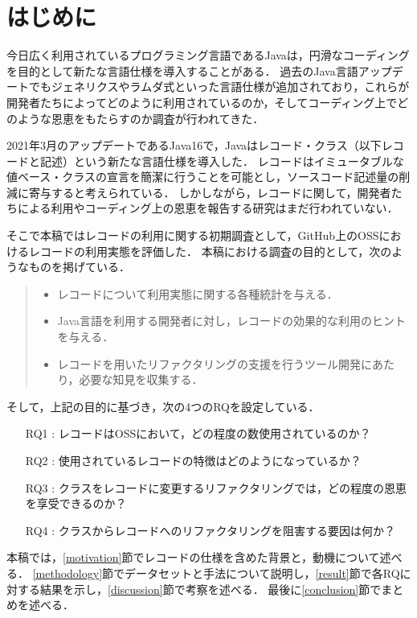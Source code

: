 \section{はじめに\label{intro}}

今日広く利用されているプログラミング言語であるJavaは，円滑なコーディングを目的として新たな言語仕様を導入することがある\cite{Usage_Of_Java_Language_Feature}．
過去のJava言語アップデートでもジェネリクスやラムダ式といった言語仕様が追加されており，これらが開発者たちによってどのように利用されているのか，そしてコーディング上でどのような恩恵をもたらすのか調査が行われてきた\cite{Generics_Research}\cite{Lambda_Research}．

2021年3月のアップデートであるJava16で，Javaはレコード・クラス（以下レコードと記述）という新たな言語仕様を導入した．
レコードはイミュータブルな値ベース・クラスの宣言を簡潔に行うことを可能とし，ソースコード記述量の削減に寄与すると考えられている．
しかしながら，レコードに関して，開発者たちによる利用やコーディング上の恩恵を報告する研究はまだ行われていない．

そこで本稿ではレコードの利用に関する初期調査として，GitHub上のOSSにおけるレコードの利用実態を評価した．
本稿における調査の目的として，次のようなものを掲げている．
\begin{quote}
  \begin{itemize}
    \item レコードについて利用実態に関する各種統計を与える．
    \item Java言語を利用する開発者に対し，レコードの効果的な利用のヒントを与える．
    \item レコードを用いたリファクタリングの支援を行うツール開発にあたり，必要な知見を収集する．
  \end{itemize}
\end{quote}

そして，上記の目的に基づき，次の4つのRQを設定している．
\begin{itemize}
  \item[RQ1 : ] レコードはOSSにおいて，どの程度の数使用されているのか？
  \item[RQ2 : ] 使用されているレコードの特徴はどのようになっているか？
  \item[RQ3 : ] クラスをレコードに変更するリファクタリングでは，どの程度の恩恵を享受できるのか？
  \item[RQ4 : ] クラスからレコードへのリファクタリングを阻害する要因は何か？
\end{itemize}

本稿では，\ref{motivation}節でレコードの仕様を含めた背景と，動機について述べる．
\ref{methodology}節でデータセットと手法について説明し，\ref{result}節で各RQに対する結果を示し，\ref{discussion}節で考察を述べる．
最後に\ref{conclusion}節でまとめを述べる．